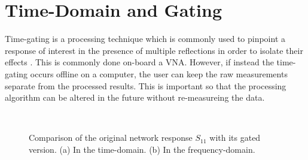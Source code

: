 \documentclass[journal, onecolumn]{IEEEtran}
\begin{document}
\section{Time-Domain and Gating}
Time-gating is a processing technique which is commonly used to pinpoint a response of interest in the presence of multiple reflections in order to isolate their effects \cite{cronson1973, bennett1978}. This is commonly done on-board a VNA. However, if instead the time-gating occurs offline on a computer, the user can keep the raw measurements separate from the processed results. This is important so that the processing algorithm can be altered in the future without re-measureing the data. 

\begin{figure}
	\centering
	\\
	\caption{Comparison of the original network response $S_{11}$ with its gated version. (a) In the time-domain. (b) In the frequency-domain.}
	\label{figs:gating}
\end{figure}
\end{document}
